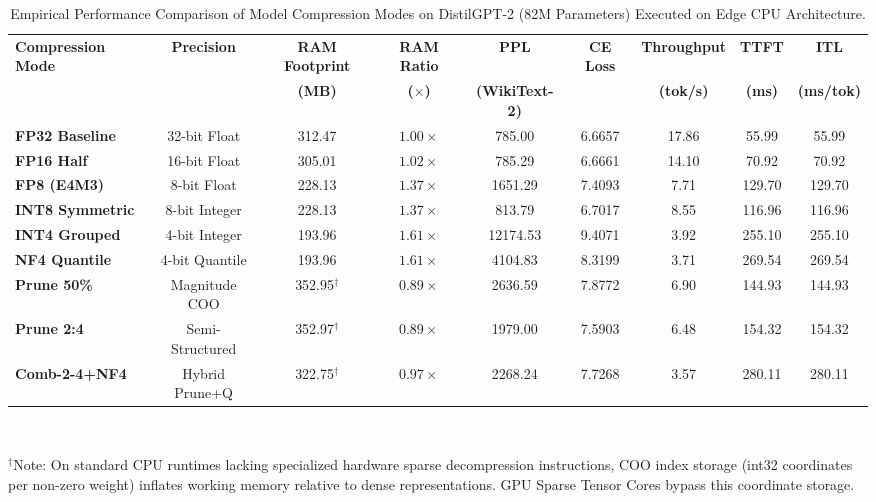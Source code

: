 \documentclass[conference]{IEEEtran}
\begin{document}
\begin{table}[t]
\centering
\caption{Empirical Performance Comparison of Model Compression Modes on DistilGPT-2 (82M Parameters) Executed on Edge CPU Architecture.}
\label{tab:results}
\begin{tabularx}{\textwidth}{lcccccccc}
\toprule
\textbf{Compression Mode} & \textbf{Precision} & \textbf{RAM Footprint} & \textbf{RAM Ratio} & \textbf{PPL} & \textbf{CE Loss} & \textbf{Throughput} & \textbf{TTFT} & \textbf{ITL} \\
 & & \textbf{(MB)} & \textbf{($\times$)} & \textbf{(WikiText-2)} & & \textbf{(tok/s)} & \textbf{(ms)} & \textbf{(ms/tok)} \\
\midrule
\textbf{FP32 Baseline} & 32-bit Float & 312.47 & $1.00\times$ & 785.00 & 6.6657 & 17.86 & 55.99 & 55.99 \\
\textbf{FP16 Half} & 16-bit Float & 305.01 & $1.02\times$ & 785.29 & 6.6661 & 14.10 & 70.92 & 70.92 \\
\textbf{FP8 (E4M3)} & 8-bit Float & 228.13 & $1.37\times$ & 1651.29 & 7.4093 & 7.71 & 129.70 & 129.70 \\
\textbf{INT8 Symmetric} & 8-bit Integer & 228.13 & $1.37\times$ & 813.79 & 6.7017 & 8.55 & 116.96 & 116.96 \\
\textbf{INT4 Grouped} & 4-bit Integer & 193.96 & $1.61\times$ & 12174.53 & 9.4071 & 3.92 & 255.10 & 255.10 \\
\textbf{NF4 Quantile} & 4-bit Quantile & 193.96 & $1.61\times$ & 4104.83 & 8.3199 & 3.71 & 269.54 & 269.54 \\
\textbf{Prune 50\%} & Magnitude COO & 352.95$^\dagger$ & $0.89\times$ & 2636.59 & 7.8772 & 6.90 & 144.93 & 144.93 \\
\textbf{Prune 2:4} & Semi-Structured & 352.97$^\dagger$ & $0.89\times$ & 1979.00 & 7.5903 & 6.48 & 154.32 & 154.32 \\
\textbf{Comb-2-4+NF4} & Hybrid Prune+Q & 322.75$^\dagger$ & $0.97\times$ & 2268.24 & 7.7268 & 3.57 & 280.11 & 280.11 \\
\bottomrule
\end{tabularx}
\vspace{1mm}\\
\raggedright \footnotesize{$^\dagger$Note: On standard CPU runtimes lacking specialized hardware sparse decompression instructions, COO index storage (int32 coordinates per non-zero weight) inflates working memory relative to dense representations. GPU Sparse Tensor Cores bypass this coordinate storage.}
\end{table}
\end{document}
